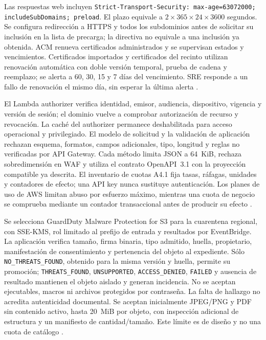 Las respuestas web incluyen \texttt{Strict-Transport-Security: max-age=63072000; includeSubDomains; preload}. El plazo equivale a $2\times365\times24\times3600$ segundos. Se configura redirección a HTTPS y todos los subdominios antes de solicitar su inclusión en la lista de precarga; la directiva no equivale a una inclusión ya obtenida. ACM renueva certificados administrados y se supervisan estados y vencimientos. Certificados importados y certificados del recinto utilizan renovación automática con doble versión temporal, prueba de cadena y reemplazo; se alerta a 60, 30, 15 y 7 días del vencimiento. SRE responde a un fallo de renovación el mismo día, sin esperar la última alerta \parencite{sec-hsts}.

El Lambda authorizer verifica identidad, emisor, audiencia, dispositivo, vigencia y versión de sesión; el dominio vuelve a comprobar autorización de recurso y revocación. La caché del authorizer permanece deshabilitada para acceso operacional y privilegiado. El modelo de solicitud y la validación de aplicación rechazan esquema, formatos, campos adicionales, tipo, longitud y reglas no verificadas por API Gateway. Cada método limita JSON a 64~KiB, rechaza sobredimensión en WAF y utiliza el contrato OpenAPI~3.1 con la proyección compatible ya descrita. El inventario de cuotas A4.1 fija tasas, ráfagas, unidades y contadores de efecto; una API key nunca sustituye autenticación. Los planes de uso de AWS limitan abuso por esfuerzo máximo, mientras una cuota de negocio se comprueba mediante un contador transaccional antes de producir su efecto \parencites{p3-api-cuotas,p3-api-validacion,p3-waf-cuerpos}.

Se selecciona GuardDuty Malware Protection for S3 para la cuarentena regional, con SSE-KMS, rol limitado al prefijo de entrada y resultados por EventBridge. La aplicación verifica tamaño, firma binaria, tipo admitido, huella, propietario, manifestación de consentimiento y pertenencia del objeto al expediente. Sólo \texttt{NO\_THREATS\_FOUND}, obtenido para la misma versión y huella, permite su promoción; \texttt{THREATS\_FOUND}, \texttt{UNSUPPORTED}, \texttt{ACCESS\_DENIED}, \texttt{FAILED} y ausencia de resultado mantienen el objeto aislado y generan incidencia. No se aceptan ejecutables, macros ni archivos protegidos por contraseña. La falta de hallazgo no acredita autenticidad documental. Se aceptan inicialmente JPEG/PNG y PDF sin contenido activo, hasta 20~MiB por objeto, con inspección adicional de estructura y un manifiesto de cantidad/tamaño. Este límite es de diseño y no una cuota de catálogo \parencites{sec-gdu-s3,sec-gdu-s3-estados,sec-gdu-s3-cifrado}.

